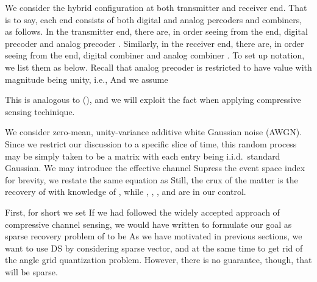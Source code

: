 We consider the hybrid configuration at both transmitter and receiver end.
That is to say, each end consists of both digital and analog percoders and combiners, as follows.
In the transmitter end, there are, in order seeing from the end, digital precoder  and analog precoder .
Similarly, in the receiver end, there are, in order seeing from the end, digital combiner  and analog combiner .
To set up notation, we list them as below.
Recall that analog precoder is restricted to have value with magnitude being unity, i.e.,
And we assume

This is analogous to (), and we will exploit the fact when applying compressive sensing techinique.

We consider zero-mean, unity-variance additive white Gaussian noise (AWGN).
Since we restrict our discussion to a specific slice of time, this random process may be simply taken to be a matrix  with each entry being i.i.d.\ standard Gaussian.
We may introduce the effective channel
Supress the event space index for brevity, we restate the same equation as
Still, the crux of the matter is the recovery of  with knowledge of , while , , , and  are in our control.

\stopsection
\startsection [title={Proposed Method}]
\startsubsection [title={Vectorization}]

First, for short we set
If we had followed the widely accepted approach of compressive channel sensing, we would have written
to formulate our goal as sparse recovery problem of  to be
As we have motivated in previous sections, we want to use DS by considering sparse vector, and at the same time to get rid of the angle grid quantization problem.
However, there is no guarantee, though, that  will be sparse.

